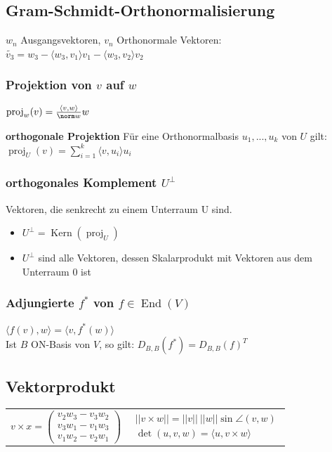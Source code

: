 \documentclass[german, fourcolumn, 8pt]{latex4ei/latex4ei_sheet}
\DeclareMathOperator{\Kern}{Kern}
\DeclareMathOperator{\End}{End}
\DeclareMathOperator{\proj}{proj}
\begin{document}
\begin{sectionbox}
    \subsection{Gram-Schmidt-Orthonormalisierung}
    $w_n$ Ausgangsvektoren, $v_n$ Orthonormale Vektoren:\\
    $\tilde{v_3}=w_3 - \langle w_3,v_1 \rangle v_1 - \langle w_3,v_2 \rangle v_2$

    \subsubsection{Projektion von $v$ auf $w$}
    $\proj_w(v)=\frac{\langle v,w \rangle}{\norm w}w$

    \textbf{orthogonale Projektion}
    Für eine Orthonormalbasis $u_1, ..., u_k$ von $U$ gilt:
    $\proj_U(v)=\sum_{i=1}^{k}\langle v,u_i \rangle u_i$

    \subsubsection{orthogonales Komplement $U^\perp$}
    Vektoren, die senkrecht zu einem Unterraum U sind.
    \begin{itemize}
        \item $U^\perp=\Kern(\proj_U)$
        \item $U^\perp$ sind alle Vektoren, dessen Skalarprodukt mit Vektoren aus dem Unterraum $0$ ist
    \end{itemize}

    \subsubsection{Adjungierte $f^*$ von $f \in \End(V)$}
    $\langle f(v), w \rangle = \langle v, f^*(w) \rangle $\\
    Ist $B$ ON-Basis von $V$, so gilt: $D_{B,B}(f^*)=D_{B,B}(f)^T$
\end{sectionbox}

\begin{sectionbox}
    \subsection{Vektorprodukt}
    \tiny
    \begin{tabular}{c|c}
        $v\times x =
        \begin{pmatrix}
                v_2w_3-v_3w_2 \\
                v_3w_1-v_1w_3 \\
                v_1w_2-v_2w_1
            \end{pmatrix}$ &
        $\begin{matrix}
                 || v \times w || = ||v|| \: ||w|| \sin \angle (v,w) \\
                 \det (u, v, w) = \langle u, v \times w \rangle
             \end{matrix}$
    \end{tabular}
    \normalsize
\end{sectionbox}
\end{document}
